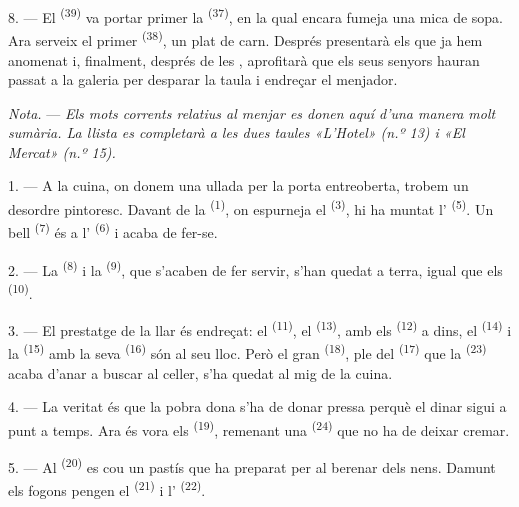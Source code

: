 8. --- El  \textsuperscript{(39)} va portar primer la
 \textsuperscript{(37)}, en la qual encara fumeja una mica de sopa.
Ara serveix el primer  \textsuperscript{(38)}, un plat de carn.
Després presentarà els que ja hem anomenat i, finalment, després de les
, aprofitarà que els seus senyors hauran passat a la galeria per
desparar la taula i endreçar el menjador.

\textit{Nota.} --- \textit{Els mots corrents relatius al menjar es donen aquí
d'una manera molt sumària. La llista es completarà a les dues taules «L'Hotel»
(n.º 13) i «El Mercat» (n.º 15).}

\VUsaut{4.6mm}
\VUsaut{3.0mm}

1. --- A la cuina, on donem una ullada per la porta entreoberta, trobem un
desordre pintoresc. Davant de la  \textsuperscript{(1)}, on
espurneja el  \textsuperscript{(3)}, hi ha muntat l' \textsuperscript{(5)}. Un bell  \textsuperscript{(7)} és
a l' \textsuperscript{(6)} i acaba de fer-se.

2. --- La  \textsuperscript{(8)} i la 
\textsuperscript{(9)}, que s'acaben de fer servir, s'han quedat a terra, igual que
els  \textsuperscript{(10)}.

3. --- El prestatge de la llar és endreçat: el 
\textsuperscript{(11)}, el  \textsuperscript{(13)}, amb els
 \textsuperscript{(12)} a dins, el 
\textsuperscript{(14)} i la  \textsuperscript{(15)} amb la seva
 \textsuperscript{(16)} són al seu lloc. Però el gran
 \textsuperscript{(18)}, ple del 
\textsuperscript{(17)} que la  \textsuperscript{(23)} acaba d'anar
a buscar al celler, s'ha quedat al mig de la cuina.

4. --- La veritat és que la pobra dona s'ha de donar pressa perquè el dinar sigui
a punt a temps. Ara és vora els  \textsuperscript{(19)}, remenant
una  \textsuperscript{(24)} que no ha de deixar cremar.

5. --- Al  \textsuperscript{(20)} es cou un pastís que ha preparat per
al berenar dels nens. Damunt els fogons pengen el 
\textsuperscript{(21)} i l' \textsuperscript{(22)}.

